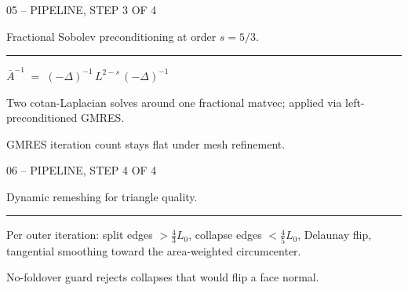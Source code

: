 \documentclass[aspectratio=169,14pt]{beamer}
\newcommand{\decklabel}[1]{%
  {\fontsize{8.5}{11}\selectfont\color{Label}\MakeUppercase{#1}\par}%
}
\newcommand{\slidetitle}[1]{%
  {\fontsize{25}{30}\selectfont\color{Text}\raggedright #1\par}%
}
\newcommand{\slidebody}[1]{%
  {\fontsize{12.2}{15.4}\selectfont\color{Dim}\raggedright #1\par}%
}
\newcommand{\tinynote}[1]{%
  {\fontsize{8.5}{10}\selectfont\color{Label}#1\par}%
}
\newcommand{\thinrule}{%
  \par\vspace{0.24cm}%
  {\color{Rule}\rule{2.45cm}{0.35pt}}%
  \par\vspace{0.25cm}%
}
\begin{document}
\begin{frame}[plain]
  \vspace*{0.82cm}
  \hspace*{1.22cm}
  \begin{minipage}{0.78\paperwidth}
  \raggedright
  \decklabel{05 -- Pipeline, step 3 of 4}
  \vspace{0.54cm}
  \slidetitle{Fractional Sobolev preconditioning at order $s = 5/3$.}
  \thinrule
  \begin{center}
  {\fontsize{14}{16}\selectfont\color{Text}
  $\displaystyle \bar{A}^{-1} \;=\; (-\Delta)^{-1}\, L^{2-s}\, (-\Delta)^{-1}$%
  }
  \end{center}
  \vspace{0.30cm}
  \slidebody{Two cotan-Laplacian solves around one fractional matvec; applied via left-preconditioned GMRES.}
  \vspace{0.18cm}
  \tinynote{GMRES iteration count stays flat under mesh refinement.}
  \end{minipage}
\end{frame}

\begin{frame}[plain]
  \vspace*{0.82cm}
  \hspace*{1.22cm}
  \begin{minipage}{0.78\paperwidth}
  \raggedright
  \decklabel{06 -- Pipeline, step 4 of 4}
  \vspace{0.54cm}
  \slidetitle{Dynamic remeshing for triangle quality.}
  \thinrule
  \slidebody{Per outer iteration: split edges $>\tfrac{4}{3}L_0$, collapse edges $<\tfrac{4}{5}L_0$, Delaunay flip, tangential smoothing toward the area-weighted circumcenter.}
  \vspace{0.18cm}
  \tinynote{No-foldover guard rejects collapses that would flip a face normal.}
  \end{minipage}
\end{frame}
\end{document}
